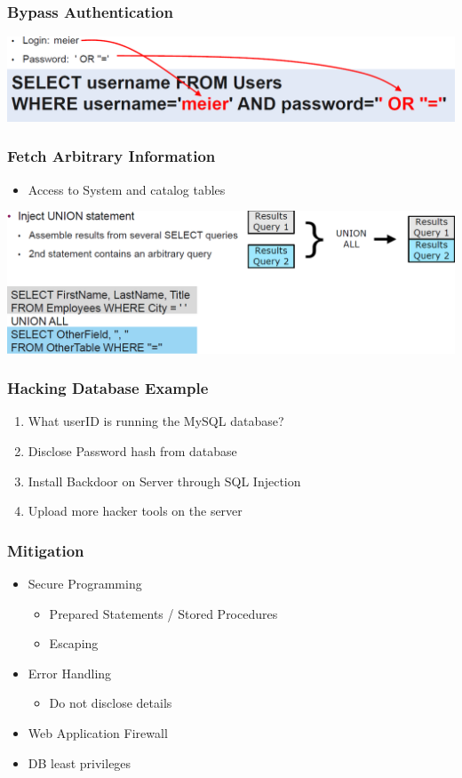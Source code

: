\subsubsection{Bypass Authentication}
\includegraphics[width=\linewidth]{../img/sql_injection2.png}
\subsubsection{Fetch Arbitrary Information}
\begin{itemize}
    \item Access to System and catalog tables
\end{itemize}
\includegraphics[width=\linewidth]{../img/sql_injection3.png}

\subsubsection{Hacking Database Example}
\begin{enumerate}
    \item What userID is running the MySQL database?
    \item Disclose Password hash from database
    \item Install Backdoor on Server through SQL Injection
    \item Upload more hacker tools on the server
\end{enumerate}

\subsubsection{Mitigation}
\begin{itemize}
    \item Secure Programming
    \begin{itemize}
        \item Prepared Statements / Stored Procedures
        \item Escaping
    \end{itemize}
    \item Error Handling
    \begin{itemize}
        \item Do not disclose details
    \end{itemize}
    \item Web Application Firewall
    \item DB least privileges
\end{itemize}

